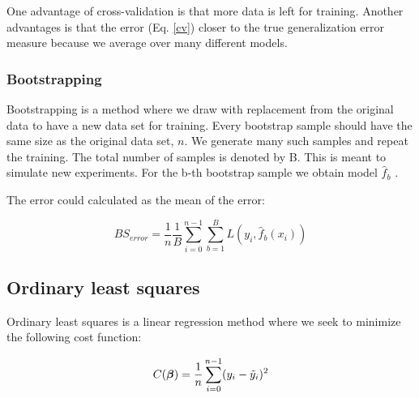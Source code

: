 One advantage of cross-validation is that more data is left for training. Another advantages is that the error (Eq. \ref{cv}) closer to the true generalization error measure because we average over many different models. 


\subsubsection{Bootstrapping}
Bootstrapping is a method where we draw with replacement from the original data to have a new data set for training. Every bootstrap sample should have the same size as the original data set, $n$. We generate many such samples and repeat the training. The total number of samples is denoted by B. This is meant to simulate new experiments. 
For the b-th bootstrap sample we obtain model $\hat{f}_b$ \citep[p. 249]{hastie}.

The error could calculated as the mean of the error:

\begin{equation}
    BS_{error} = \frac{1}{n}\frac{1}{B}\sum_{i=0}^{n-1}\sum_{b=1}^{B} L\left(y_i, \hat{f}_b(x_i)\right)
\end{equation}






\subsection{Ordinary least squares}

Ordinary least squares is a linear regression method where we seek to minimize the following cost function:

\begin{equation}\label{cost_ols}
    C(\boldsymbol{\beta}) = \frac{1}{n}\sum_{i=0}^{n-1}(y_i-\Tilde{y}_i)^2
\end{equation}

